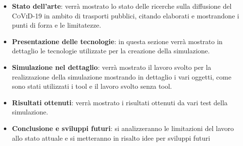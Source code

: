 \documentclass[12pt, openany]{book}
\begin{document}
		\begin{itemize}
			\item \textbf{Stato dell'arte}: verrà mostrato lo stato delle ricerche sulla diffusione del \textsc{CoViD-19} in ambito di trasporti pubblici, citando elaborati e mostrandone i punti di forza e le limitatezze.
			\item \textbf{Presentazione delle tecnologie}: in questa sezione verrà mostrato in dettaglio le tecnologie utilizzate per la creazione della simulazione.
			\item\textbf{Simulazione nel dettaglio}: verrà mostrato il lavoro svolto per la realizzazione della simulazione mostrando in dettaglio i vari oggetti, come sono stati utilizzati i tool e il lavoro svolto senza tool.
			\item\textbf{Risultati ottenuti}: verrà mostrato i risultati ottenuti da vari test della simulazione.
			\item\textbf{Conclusione e sviluppi futuri}: si analizzeranno le limitazioni del lavoro allo stato attuale e si metteranno in risalto idee per sviluppi futuri
		\end{itemize}
\end{document}
